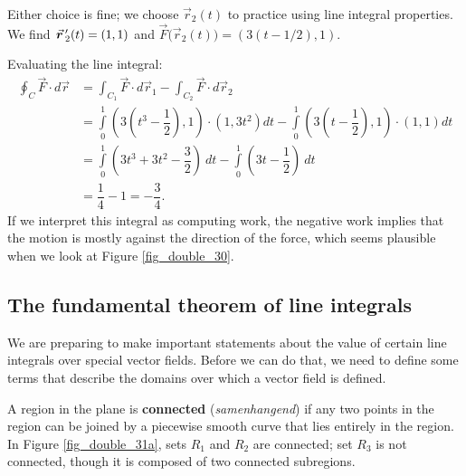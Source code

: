 \begin{example}
Either choice is fine; we choose $\vec r_2(t)$ to practice using line integral properties. We find \linebreak $\vrp_2(t) = \left( 1,1\right)$ and $\vec F\big(\vec r_2(t)\big) = \left( 3(t-1/2),1\right)$.

Evaluating the line integral:
\begin{align*}
\oint_C \vec F\cdot d\vec r &= \int_{C_1}\vec F\cdot d\vec r_1 - \int_{C_2}\vec F\cdot d\vec r_2 \\
			&= \int\limits_0^1 \left( 3\left(t^3-\dfrac{1}{2}\right),1\right)\cdot \left( 1,3t^2\right) dt- \int\limits_0^1 \left( 3\left(t-\dfrac{1}{2}\right),1\right)\cdot \left(1,1\right) dt \\
			&= \int\limits_0^1\left(3t^3+3t^2-\dfrac{3}{2}\right)\ dt - \int\limits_0^1 \left(3t-\dfrac{1}{2}\right)\ dt\\
			&= \dfrac{1}{4} - 1 = -\dfrac{3}{4}.
\end{align*}
If we interpret this integral as computing work, the negative work implies that the motion is mostly against the direction of the force, which seems plausible when we look at Figure \ref{fig_double_30}.
\end{example}

\subsection{The fundamental theorem of line integrals}
	\checkoddpage
{}

We are preparing to make important statements about the value of certain line integrals over special vector fields. Before we can do that, we need to define some terms that describe the domains over which a vector field is defined.

A region in the plane is \textbf{connected} (\textit{samenhangend}) if any two points in the region can be joined by a piecewise smooth curve that lies entirely in the region. In Figure \ref{fig_double_31a}, sets $R_1$ and $R_2$ are connected; set $R_3$ is not connected, though it is composed of two connected subregions.

